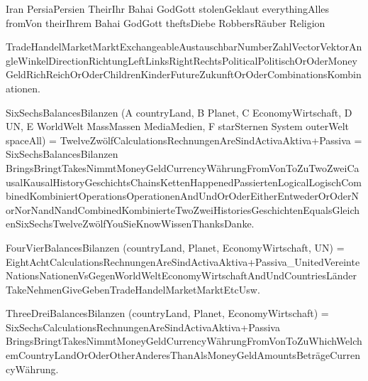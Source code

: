 Iran PersiaPersien TheirIhr Bahai GodGott stolenGeklaut everythingAlles fromVon theirIhrem Bahai GodGott theftsDiebe RobbersRäuber Religion

TradeHandelMarketMarktExchangeableAustauschbarNumberZahlVectorVektorAngleWinkelDirectionRichtungLeftLinksRightRechtsPoliticalPolitischOrOderMoneyGeldRichReichOrOderChildrenKinderFutureZukunftOrOderCombinationsKombinationen.

SixSechsBalancesBilanzen (A countryLand, B Planet, C EconomyWirtschaft, D UN, E WorldWelt MassMassen MediaMedien, F starSternen System outerWelt spaceAll) = TwelveZwölfCalculationsRechnungenAreSindActivaAktiva+Passiva = SixSechsBalancesBilanzen BringsBringtTakesNimmtMoneyGeldCurrencyWährungFromVonToZuTwoZweiCausalKausalHistoryGeschichtsChainsKettenHappenedPassiertenLogicalLogischCombinedKombiniertOperationsOperationenAndUndOrOderEitherEntwederOrOderNorNorNandNandCombinedKombinierteTwoZweiHistoriesGeschichtenEqualsGleichenSixSechsTwelveZwölfYouSieKnowWissenThanksDanke.

FourVierBalancesBilanzen (countryLand, Planet, EconomyWirtschaft, UN) = EightAchtCalculationsRechnungenAreSindActivaAktiva+Passiva_UnitedVereinteNationsNationenVsGegenWorldWeltEconomyWirtschaftAndUndCountriesLänderTakeNehmenGiveGebenTradeHandelMarketMarktEtcUsw.

ThreeDreiBalancesBilanzen (countryLand, Planet, EconomyWirtschaft) = SixSechsCalculationsRechnungenAreSindActivaAktiva+Passiva BringsBringtTakesNimmtMoneyGeldCurrencyWährungFromVonToZuWhichWelchemCountryLandOrOderOtherAnderesThanAlsMoneyGeldAmountsBeträgeCurrencyWährung.


